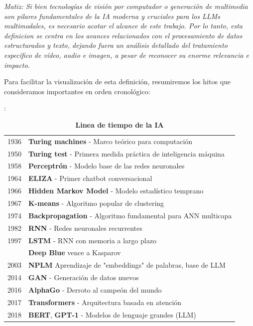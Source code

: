\begin{enumerate}
	\emph{Matiz: Si bien tecnologías de visión por computador o generación de multimedia son pilares fundamentales de la IA moderna y cruciales para los LLMs multimodales, es necesario acotar el alcance de este trabajo. Por lo tanto, esta definicion se centra en los avances relacionados con el procesamiento de datos estructurados y texto, dejando fuera un análisis detallado del tratamiento específico de vídeo, audio e imagen, a pesar de reconocer su enorme relevancia e impacto.}
		
		
	Para facilitar la visualización de esta definición, resumiremos los hitos que consideramos importantes en orden cronológico:
	\begin{table}[h]
		\centering
		
		\caption{\textbf{Linea de tiempo de la IA}}:
		\begin{tabular}{@{}r@{\hspace{1em}}|@{\hspace{1em}}p{11cm}@{}}
			1936 & \textbf{Turing machines} - Marco teórico para computación \\
			1950 & \textbf{Turing test} - Primera medida práctica de inteligencia máquina \\
			1958 & \textbf{Perceptrón} - Modelo base de las redes neuronales \\
			1964 & \textbf{ELIZA} - Primer chatbot conversacional \\
			1966 & \textbf{Hidden Markov Model} - Modelo estadístico temprano \\ 
			1967 & \textbf{K-means} - Algoritmo popular de clustering \\
			1974 & \textbf{Backpropagation} - Algoritmo fundamental para ANN multicapa \\	
			1982 & \textbf{RNN} - Redes neuronales recurrentes\\
			1997 & \textbf{LSTM} - RNN con memoria a largo plazo \\
			\    & \textbf{Deep Blue} vence a Kasparov \\
			2003 & \textbf{NPLM} Aprendizaje de "embeddings" de palabras, base de  LLM \\
			2014 & \textbf{GAN} - Generación de datos nuevos \\
			2016 & \textbf{AlphaGo} - Derroto al campeón del mundo \\
			2017 & \textbf{Transformers} - Arquitectura basada en atención \\
			2018 & \textbf{BERT}, \textbf{GPT-1} - Modelos de lenguaje grandes (LLM) \\

\end{tabular}
\end{table}
\end{enumerate}
